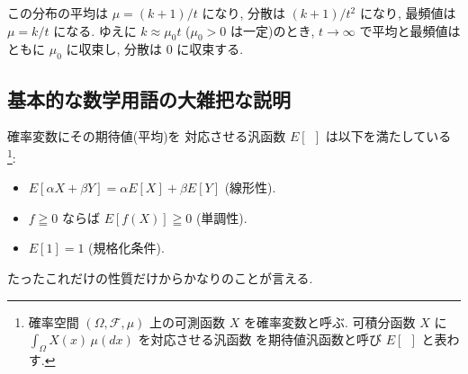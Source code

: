 \documentclass[12pt,twoside]{jarticle}
\theoremstyle{jplain}
\theoremstyle{jplain}
\theoremstyle{jplain}
\numberwithin{theorem}{section}
\numberwithin{equation}{section}
\numberwithin{figure}{section}
\numberwithin{table}{section}
\begin{document}
この分布の平均は $\mu=(k+1)/t$ になり,
分散は $(k+1)/t^2$ になり,
最頻値は $\mu=k/t$ になる.
ゆえに $k\approx \mu_0 t$ ($\mu_0>0$ は一定)のとき,
$t\to\infty$ で平均と最頻値はともに $\mu_0$ に収束し,
分散は $0$ に収束する.


%
%
%


\subsection{基本的な数学用語の大雑把な説明}

確率変数にその期待値(平均)を
対応させる汎函数 $E[\ \ ]$ は以下を満たしている%
\footnote{確率空間 $(\Omega,\mathcal{F},\mu)$ 上の可測函数 $X$ を確率変数と呼ぶ.
可積分函数 $X$ に $\int_\Omega X(x)\,\mu(dx)$ を対応させる汎函数
を期待値汎函数と呼び $E[\ \ ]$ と表わす.}:
\begin{itemize}
\item $E[\alpha X+\beta Y]=\alpha E[X]+\beta E[Y]$ (線形性).
\item $f\geqq 0$ ならば $E[f(X)]\geqq 0$ (単調性).
\item $E[1]=1$ (規格化条件).
\end{itemize}
たったこれだけの性質だけからかなりのことが言える.
\end{document}
